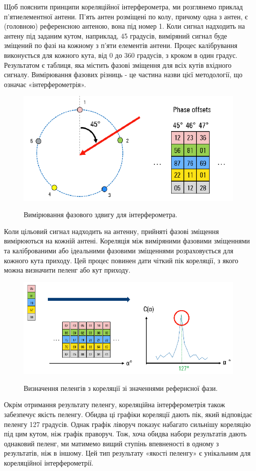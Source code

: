 \documentclass{article}
\begin{document}
Щоб пояснити принципи кореляційної інтерферометра, ми розглянемо приклад п'ятиелементної антени. П'ять антен розміщені по колу, причому одна з антен, є  (головною) референсною антеною, вона під номер 1. Коли сигнал надходить на антену під заданим кутом, наприклад, 45 градусів, виміряний сигнал буде зміщений по фазі на кожному з п'яти елементів антени. Процес калібрування виконується для кожного кута, від 0 до 360 градусів, з кроком в один градус. Результатом є таблиця, яка містить фазові зміщення для всіх кутів вхідного сигналу. Вимірювання фазових різниць - це частина назви цієї методології, що означає «інтерферометрія».

\begin{figure}[H]
	\centering
	{\includegraphics[width=0.6\linewidth]{images/correletion_interf.png}}
	\caption{Вимірювання фазового здвигу для інтерферометра.}
\end{figure}

Коли цільовий сигнал надходить на антенну, прийняті фазові зміщення вимірюються на кожній антені. Кореляція між виміряними фазовими зміщеннями та каліброваними або ідеальними фазовими зміщеннями розраховується для кожного кута приходу. Цей процес повинен дати чіткий пік кореляції, з якого можна визначити пеленг або кут приходу.


\begin{figure}[H]
	\centering
	{\includegraphics[width=0.7\linewidth]{images/correletaion_interft_meas.png}}
	\caption{Визначення пеленгів з кореляції зі значеннями рефернсної фази.}
\end{figure}

Окрім отримання результату пеленгу, кореляційна інтерферометрія також забезпечує якість пеленгу. Обидва ці графіки кореляції дають пік, який відповідає пеленгу 127 градусів. Однак графік ліворуч показує набагато сильнішу кореляцію під цим кутом, ніж графік праворуч. Тож, хоча обидва набори результатів дають однаковий пеленг, ми матимемо вищий ступінь впевненості в одному з результатів, ніж в іншому. Цей тип результату «якості пеленгу» є унікальним для кореляційної інтерферометрії.
\end{document}
